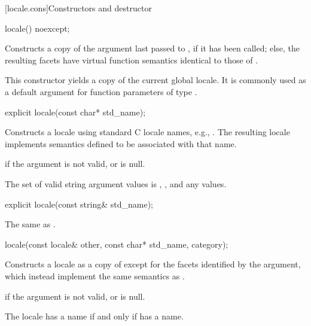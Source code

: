 [locale.cons]{Constructors and destructor}

%
\begin{itemdecl}
locale() noexcept;
\end{itemdecl}

\begin{itemdescr}
\pnum
\effects
Constructs a copy of the argument last passed to
,
if it has been called; else, the resulting facets have virtual
function semantics identical to those of
.
\begin{note}
This constructor yields a copy of the current global locale.
It is commonly used as a default argument for
function parameters of type .
\end{note}
\end{itemdescr}

%
\begin{itemdecl}
explicit locale(const char* std_name);
\end{itemdecl}

\begin{itemdescr}
\pnum
\effects
Constructs a locale using standard C locale names, e.g., .
The resulting locale implements semantics defined to be associated
with that name.

\pnum
\throws
{}
if the argument is not valid, or is null.

\pnum
\remarks
The set of valid string argument values is , ,
and any  values.
\end{itemdescr}

%
\begin{itemdecl}
explicit locale(const string& std_name);
\end{itemdecl}

\begin{itemdescr}
\pnum
\effects
The same as .
\end{itemdescr}

%
\begin{itemdecl}
locale(const locale& other, const char* std_name, category);
\end{itemdecl}

\begin{itemdescr}
\pnum
\effects
Constructs a locale as a copy of
except for the facets identified by the
argument, which instead implement the same semantics as
.

\pnum
\throws
{}
if the argument is not valid, or is null.

\pnum
\remarks
The locale has a name if and only if
has a name.
\end{itemdescr}

